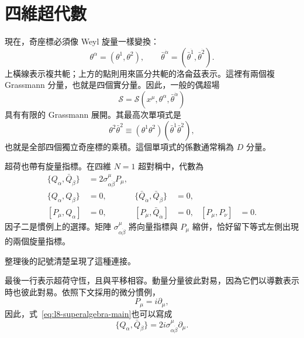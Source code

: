 \section{四維超代數}

現在，奇座標必須像 Weyl 旋量一樣變換：
\begin{equation}
\theta^\alpha=(\theta^1,\theta^2),
\qquad
\bar\theta^{\dot\alpha}=(\bar\theta^{\dot1},\bar\theta^{\dot2}).
\end{equation}
上橫線表示複共軛；上方的點則用來區分共軛的洛侖茲表示。這裡有兩個複 Grassmann 分量，也就是四個實分量。因此，一般的偶超場
\begin{equation}
\mathcal S=\mathcal S(x^\mu,\theta^\alpha,\bar\theta^{\dot\alpha})
\end{equation}
具有有限的 Grassmann 展開。其最高次單項式是
\begin{equation}
\theta^2\bar\theta^2
\equiv
(\theta^1\theta^2)(\bar\theta^{\dot1}\bar\theta^{\dot2}),
\end{equation}
也就是全部四個獨立奇座標的乘積。這個單項式的係數通常稱為 \(D\) 分量。

超荷也帶有旋量指標。在四維 \(N=1\) 超對稱中，代數為
\begin{align}
\{Q_\alpha,\bar Q_{\dot\beta}\}
&=2\sigma^\mu_{\alpha\dot\beta}P_\mu,
\label{eq:l8-superalgebra-main}\\
\{Q_\alpha,Q_\beta\}&=0,
&
\{\bar Q_{\dot\alpha},\bar Q_{\dot\beta}\}&=0,
\label{eq:l8-superalgebra-nilpotent}\\
[P_\mu,Q_\alpha]&=0,
&
[P_\mu,\bar Q_{\dot\alpha}]&=0,
&
[P_\mu,P_\nu]&=0.
\label{eq:l8-superalgebra-commutators}
\end{align}
因子二是慣例上的選擇。矩陣
\(\sigma^\mu_{\alpha\dot\beta}\)
將向量指標與 \(P_\mu\) 縮併，恰好留下等式左側出現的兩個旋量指標。

\begin{classroomqa}
\end{classroomqa}

整理後的記號清楚呈現了這種連接。

最後一行表示超荷守恆，且與平移相容。動量分量彼此對易，因為它們以導數表示時也彼此對易。依照下文採用的微分慣例，
\begin{equation}
P_\mu=i\partial_\mu,
\end{equation}
因此，式~\eqref{eq:l8-superalgebra-main}也可以寫成
\begin{equation}
\{Q_\alpha,\bar Q_{\dot\beta}\}
=2i\sigma^\mu_{\alpha\dot\beta}\partial_\mu.
\end{equation}

